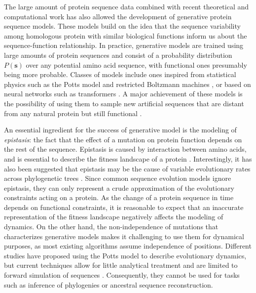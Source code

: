 The large amount of protein sequence data combined with recent theoretical and computational work has also allowed the development of generative protein sequence models. 
These models build on the idea that the sequence variability among homologous protein with similar biological functions inform us about the sequence-function relationship. 
In practice, generative models are trained using large amounts of protein sequences and consist of a probability distribution $P(\mathbf{s})$ over any potential amino acid sequence, with functional ones presumably being more probable. 
Classes of models include ones inspired from statistical physics such as the Potts model \cite{cocco_inversestatisticalphysics_2018} and restricted Boltzmann machines \cite{tubiana_learningproteinconstitutive_2019}, or based on neural networks such as transformers \cite{rao_msatransformer_2021,ferruz_protgpt2deepunsupervised_2022}. 
A major achievement of these models is the possibility of using them to sample new artificial sequences that are distant from any natural protein but still functional \cite{tian_coevolutionaryfitnesslandscapes_2018,russ_evolutionbasedmodeldesigning_2020}.

An essential ingredient for the success of generative model is the modeling of \emph{epistasis}: the fact that the effect of a mutation on protein function depends on the rest of the sequence. 
Epistasis is caused by interaction between amino acids, and is essential to describe the fitness landscape of a protein \cite{socolich_evolutionaryinformationspecifying_2005,mcgee_generativecapacityprobabilistic_2021}. 
Interestingly, it has also been suggested that epistasis may be the cause of variable evolutionary rates across phylogenetic trees \cite{delapaz_epistaticcontributionspromote_2020}. 
Since common sequence evolution models ignore epistasis, they can only represent a crude approximation of the evolutionary constraints acting on a protein. 
As the change of a protein sequence in time depends on functional constraints, it is reasonable to expect that an inaccurate representation of the fitness landscape negatively affects the modeling of dynamics. 
On the other hand, the non-independence of mutations that characterizes generative models makes it challenging to use them for dynamical purposes, as most existing algorithms assume independence of positions. 
Different studies have proposed using the Potts model to describe evolutionary dynamics, but current techniques allow for little analytical treatment and are limited to forward simulation of sequences \cite{alvarez_vivofunctionalphenotypes_2024,bari_emergenttimescales_2024}. 
Consequently, they cannot be used for tasks such as inference of phylogenies or ancestral sequence reconstruction. 


